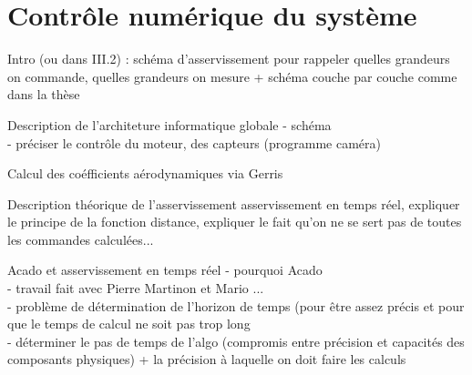 \documentclass[a4paper,twoside,12pt]{article}
\newcounter{partie}
\newcounter{sous-partie}
\newenvironment{partie}[1]
{
\section{#1}
}
{

}
\newenvironment{sous-partie}[1]
{
\subsection{#1}
}
{

}
\begin{document}
\begin{partie}{Contrôle numérique du système}
Intro (ou dans III.2) : schéma d'asservissement pour rappeler quelles grandeurs on commande, quelles grandeurs on mesure + schéma couche par  couche comme dans la thèse

\begin{sous-partie}{Description de l'architeture informatique globale}
- schéma
\\
- préciser le contrôle du moteur, des capteurs (programme caméra)
\end{sous-partie}
\begin{sous-partie}{Calcul des coéfficients aérodynamiques via Gerris}

\end{sous-partie}

\begin{sous-partie}{Description théorique de l'asservissement}
asservissement en temps réel, expliquer le principe de la fonction distance, expliquer le fait qu'on ne se sert pas de toutes les commandes calculées...
\end{sous-partie}

\begin{sous-partie}{Acado et asservissement en temps réel}
- pourquoi Acado
\\
- travail fait avec Pierre Martinon et Mario ...
\\
- problème de détermination de l'horizon de temps (pour être assez précis et pour que le temps de calcul ne soit pas trop long
\\
- déterminer le pas de temps de l'algo (compromis entre précision et capacités des composants physiques) + la précision à laquelle on doit faire les calculs
\end{sous-partie}


\end{partie}

\newpage
\end{document}
